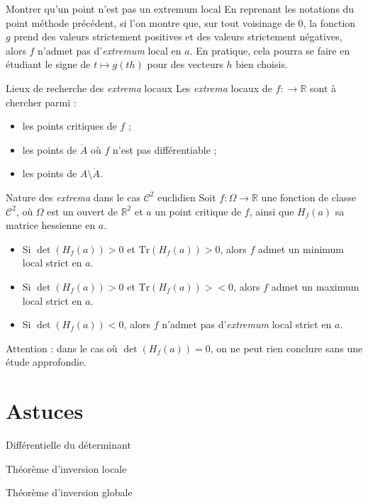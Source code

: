 \documentclass[french]{book}
\newcommand{\R}{\mathbb{R}}
\newcommand{\Tr}{\text{Tr}}
\theoremstyle{plain}
\theoremstyle{definition}
\theoremstyle{remark}
\begin{document}
\begin{PM}{Montrer qu'un point n'est pas un extremum local}
	En reprenant les notations du point méthode précédent, si l'on montre que, sur tout voisinage de $0$, la fonction $g$ prend des valeurs strictement positives et des valeurs strictement négatives, alors $f$ n'admet pas d'\textit{extremum} local en $a$. En pratique, cela pourra se faire en étudiant le signe de $t\mapsto g(th)$ pour des vecteurs $h$ bien choisis.
\end{PM}

\begin{PM}{Lieux de recherche des \textit{extrema} locaux}
	Les \textit{extrema} locaux de $f:\to\R$ sont à chercher parmi :
	\begin{itemize}
		\item les points critiques de $f$ ;
		\item les points de $\mathring{A}$ où $f$ n'est pas différentiable ;
		\item les points de $A\setminus\mathring{A}$.
	\end{itemize}
\end{PM}

\begin{PM}{Nature des \textit{extrema} dans le cas $\mathcal{C}^2$ euclidien}
	Soit $f:\Omega\to\R$ une fonction de classe $\mathcal{C}^2$, où $\Omega$ est un ouvert de $\R^2$ et $a$ un point critique de $f$, ainsi que $H_f(a)$ sa matrice hessienne en $a$.
	\begin{itemize}
		\item Si $\det(H_f(a))>0$ et $\Tr(H_f(a))>0$, alors $f$ admet un minimum local strict en $a$.
		\item Si $\det(H_f(a))>0$ et $\Tr(H_f(a))><0$, alors $f$ admet un maximum local strict en $a$.
		\item Si $\det(H_f(a))<0$, alors $f$ n'admet pas d'\textit{extremum} local strict en $a$.
	\end{itemize}
	Attention : dans le cas où $\det(H_f(a))=0$, on ne peut rien conclure sans une étude approfondie.
\end{PM}

\section{Astuces}

\begin{AS}{Différentielle du déterminant}
\end{AS}
\begin{AS}{Théorème d'inversion locale}
\end{AS}
\begin{AS}{Théorème d'inversion globale}
\end{AS}
\end{document}
